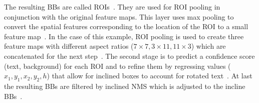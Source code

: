 The resulting \acp{BB} are called \acp{ROI}~\citep{ren_faster_2015,jiang_r2cnn_2017}.
They are used for \ac{ROI} pooling in conjunction with the original feature maps.
This layer uses max pooling to convert the spatial features corresponding to the location of the
\ac{ROI} to a small feature map~\citep{girshick_fast_2015}.
In the case of this example, \ac{ROI} pooling is used to create three feature maps with different
aspect ratios ($7\times7, 3\times11, 11\times3$) which are concatenated for the next
step~\citep{jiang_r2cnn_2017}.
The second stage is to predict a confidence score (text, background) for each \ac{ROI} and to
refine them by regressing values ($x_1,y_1,x_2,y_2,h$) that allow for inclined boxes to account for
rotated text~\citep{jiang_r2cnn_2017}.
At last the resulting \acp{BB} are filtered by inclined \ac{NMS} which is adjusted to the
incline \acp{BB}~\citep{jiang_r2cnn_2017}.

